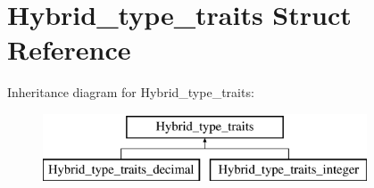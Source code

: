 \hypertarget{structHybrid__type__traits}{}\section{Hybrid\+\_\+type\+\_\+traits Struct Reference}
\label{structHybrid__type__traits}
Inheritance diagram for Hybrid\+\_\+type\+\_\+traits\+:\begin{figure}[H]
\begin{center}
\leavevmode
\includegraphics[height=2.000000cm]{structHybrid__type__traits}
\end{center}
\end{figure}
